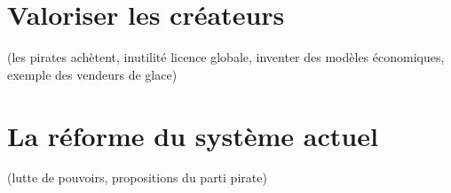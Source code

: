 \section{Valoriser les créateurs}
(les pirates achètent, inutilité licence globale, inventer des modèles économiques, exemple des vendeurs de glace)
\section{La réforme du système actuel}
(lutte de pouvoirs, propositions du parti pirate)
